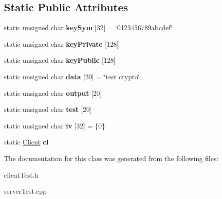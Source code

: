 \subsection*{Static Public Attributes}
\begin{DoxyCompactItemize}
\item 
\hypertarget{class_test_crypto_a994550c6ce169c04cf1acf823e4c6de0}{static unsigned char {\bfseries key\-Sym} \mbox{[}32\mbox{]} = \char`\"{}0123456789abcdef\char`\"{}}\label{class_test_crypto_a994550c6ce169c04cf1acf823e4c6de0}

\item 
\hypertarget{class_test_crypto_a75c151420ccac7b45af900df8590f308}{static unsigned char {\bfseries key\-Private} \mbox{[}128\mbox{]}}\label{class_test_crypto_a75c151420ccac7b45af900df8590f308}

\item 
\hypertarget{class_test_crypto_a1a20b83b1b20980e07900a73a89fa13f}{static unsigned char {\bfseries key\-Public} \mbox{[}128\mbox{]}}\label{class_test_crypto_a1a20b83b1b20980e07900a73a89fa13f}

\item 
\hypertarget{class_test_crypto_afc350874c113d78fcadb2c8d586ce829}{static unsigned char {\bfseries data} \mbox{[}20\mbox{]} = \char`\"{}test crypto\char`\"{}}\label{class_test_crypto_afc350874c113d78fcadb2c8d586ce829}

\item 
\hypertarget{class_test_crypto_ac1925480c4778ea13e70c98d21b22292}{static unsigned char {\bfseries output} \mbox{[}20\mbox{]}}\label{class_test_crypto_ac1925480c4778ea13e70c98d21b22292}

\item 
\hypertarget{class_test_crypto_a037f91b6c09c7b6eae4ffcdd9b3d98d0}{static unsigned char {\bfseries test} \mbox{[}20\mbox{]}}\label{class_test_crypto_a037f91b6c09c7b6eae4ffcdd9b3d98d0}

\item 
\hypertarget{class_test_crypto_a80dfa91c0c885d4a4a56d84e17196858}{static unsigned char {\bfseries iv} \mbox{[}32\mbox{]} = \{0\}}\label{class_test_crypto_a80dfa91c0c885d4a4a56d84e17196858}

\item 
\hypertarget{class_test_crypto_aa2f46eab58c3d7c0b6a3197a4f68a49f}{static \hyperlink{class_client}{Client} {\bfseries cl}}\label{class_test_crypto_aa2f46eab58c3d7c0b6a3197a4f68a49f}

\end{DoxyCompactItemize}


The documentation for this class was generated from the following files\-:\begin{DoxyCompactItemize}
\item 
client\-Test.\-h\item 
server\-Test.\-cpp\end{DoxyCompactItemize}
